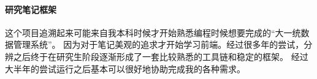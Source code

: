 \paragraph{研究笔记框架}

这个项目追溯起来可能来自我本科时候才开始熟悉编程时候想要完成的“大一统数据管理系统”。
因为对于笔记美观的追求才开始学习前端。经过很多年的尝试，分辨之后终于在研究生阶段逐渐形成了一套比较熟悉的工具链和稳定的框架。
经过大半年的尝试运行之后基本可以很好地协助完成我的各种需求。